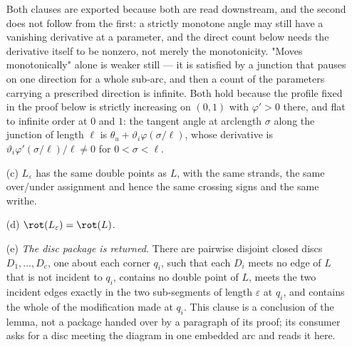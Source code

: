 \begin{lemma}[rounding]
\begin{enumerate}
Both clauses are exported because both are read downstream, and the second does
not follow from the first: a strictly monotone angle may still have a vanishing
derivative at a parameter, and the direct count below needs the derivative
itself to be nonzero, not merely the monotonicity. "Moves monotonically" alone
is weaker still --- it is
satisfied by a junction that pauses on one direction for a whole sub-arc, and
then a count of the parameters carrying a prescribed direction is infinite. Both
hold because the profile fixed in the proof below is strictly increasing on
$(0,1)$ with $\varphi'>0$ there, and flat to infinite order at $0$ and $1$: the
tangent angle at arclength $\sigma$ along the junction of length $\ell$ is
$\theta_u+\vartheta_i\varphi(\sigma/\ell)$, whose derivative is
$\vartheta_i\varphi'(\sigma/\ell)/\ell\neq0$ for $0<\sigma<\ell$.
\item[(c)] $L_\varepsilon$ has the same double points as $L$, with the same
strands, the same over/under assignment and hence the same crossing signs and
the same writhe.
\item[(d)] $\rot(L_\varepsilon)=\rot(L)$.
\item[(e)] \emph{The disc package is returned.} There are pairwise disjoint
closed discs $D_1,\dots,D_c$, one about each corner $q_i$, such that each $D_i$
meets no edge of $L$ that is not incident to $q_i$, contains no double point of
$L$, meets the two incident edges exactly in the two sub-segments of length
$\varepsilon$ at $q_i$, and contains the whole of the modification made at
$q_i$. This clause is a conclusion of the lemma, not a package handed over by a
paragraph of its proof; its consumer asks for a disc meeting the diagram in one
embedded arc and reads it here.
\end{enumerate}

\end{lemma}
